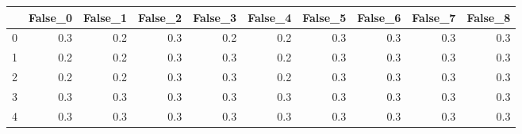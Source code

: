 \begin{tabular}{lrrrrrrrrr}
\toprule
{} &  False\_0 &  False\_1 &  False\_2 &  False\_3 &  False\_4 &  False\_5 &  False\_6 &  False\_7 &  False\_8 \\ \hline
\midrule
0 &      0.3 &      0.2 &      0.3 &      0.2 &      0.2 &      0.3 &      0.3 &      0.3 &      0.3 \\ \hline
1 &      0.2 &      0.2 &      0.3 &      0.3 &      0.2 &      0.3 &      0.3 &      0.3 &      0.3 \\ \hline
2 &      0.2 &      0.2 &      0.3 &      0.3 &      0.2 &      0.3 &      0.3 &      0.3 &      0.3 \\ \hline
3 &      0.3 &      0.3 &      0.3 &      0.3 &      0.3 &      0.3 &      0.3 &      0.3 &      0.3 \\ \hline
4 &      0.3 &      0.3 &      0.3 &      0.3 &      0.3 &      0.3 &      0.3 &      0.3 &      0.3 \\ \hline
\bottomrule
\end{tabular}
